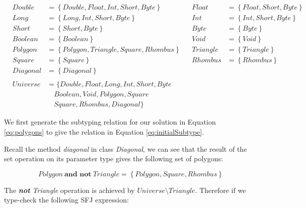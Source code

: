 \documentclass{l4proj}
\begin{document}
\begin{equation}
    \label{eq:initialSubtype}
    \begin{array}{llllll}
         & Double   & = \left\{Double, Float, Int, Short, Byte\right\}     &  & Float    & = \left\{Float, Short, Byte\right\} \\
         & Long     & =    \left\{Long, Int, Short, Byte\right\}           &  & Int      & = \left\{Int, Short, Byte\right\}   \\
         & Short    & =    \left\{Short, Byte\right\}                      &  & Byte     & = \left\{Byte\right\}               \\
         & Boolean  & =    \left\{Boolean\right\}                          &  & Void     & = \left\{Void\right\}               \\
         & Polygon  & = \left\{Polygon, Triangle, Square, Rhombus \right\} &  & Triangle & = \left\{Triangle\right\}           \\
         & Square   & = \left\{Square\right\}                              &  & Rhombus  & = \left\{Rhombus\right\}            \\
         & Diagonal & = \left\{Diagonal\right\}
        \\
        \\
         & Universe & = \{Double, Float, Long, Int, Short, Byte                                                                \\
         &          & \quad Boolean, Void, Polygon, Square                                                                     \\
         &          & \quad Square, Rhombus, Diagonal\}
    \end{array}
\end{equation}

We first generate the subtyping relation for our solution in Equation \ref{eq:polygons} to give the relation in Equation \ref{eq:initialSubtype}.

Recall the method \emph{diagonal} in class \emph{Diagonal}, we can see that the result of the set operation on its parameter type gives the following set of polygons:

\begin{equation}
    \label{eq:polygonsandnottriangle}
    Polygon\ \textbf{and not}\ Triangle = \left\{Polygon, Square, Rhombus \right\}
\end{equation}

The \emph{\textbf{not} Triangle} operation is achieved by $Universe \setminus Triangle$.
Therefore if we type-check the following SFJ expression:
\end{document}
